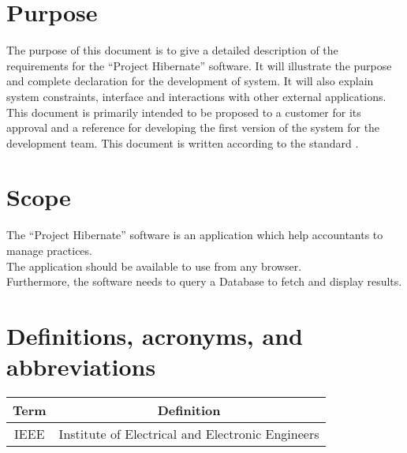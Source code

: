 \documentclass[../main.tex]{subfiles}
\begin{document}
\section{Purpose}
The purpose of this document is to give a detailed description of the requirements for the ``Project Hibernate'' software. It will illustrate the purpose and complete declaration for the development of system. It will also explain system constraints, interface and interactions with other external applications. This document is primarily intended to be proposed to a customer for its approval and a reference for developing the first version of the system for the development team. This document is written according to the standard \citep{IEEE830}.

\section{Scope}
The ``Project Hibernate'' software is an application which help accountants to manage practices.\\
The application should be available to use from any browser.\\
Furthermore, the software needs to query a Database to fetch and display results.

\section{Definitions, acronyms, and abbreviations}
\begin{tabular}{|c|c|}
    \hline
    Term & Definition  \\
    \hline
     IEEE & Institute of Electrical and Electronic Engineers \\ 
    \hline
\end{tabular}
\end{document}
